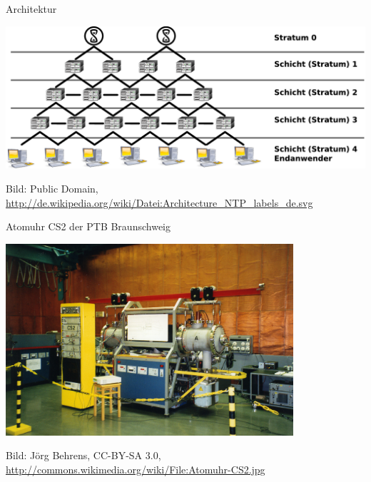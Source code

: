\documentclass{beamer}
\begin{document}
\begin{frame}{Architektur}
  \begin{center}
    \includegraphics[width=\textwidth]{Architecture_NTP_Stratum0.pdf}\par
    \tiny Bild: Public Domain,
    \url{http://de.wikipedia.org/wiki/Datei:Architecture_NTP_labels_de.svg}
  \end{center}
\end{frame}

\begin{frame}{Atomuhr CS2 der PTB Braunschweig}
  \begin{center}
    \includegraphics[width=0.8\textwidth]{Atomuhr-CS2.jpg}
    \par\tiny Bild: Jörg Behrens, CC-BY-SA 3.0,
    \url{http://commons.wikimedia.org/wiki/File:Atomuhr-CS2.jpg}
  \end{center}
\end{frame}
\end{document}
